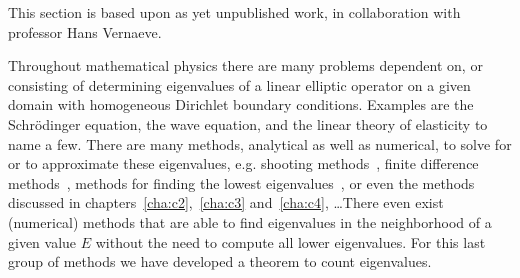 This section is based upon as yet unpublished work, in collaboration with professor Hans Vernaeve.

Throughout mathematical physics there are many problems dependent on, or consisting of determining eigenvalues of a linear elliptic operator on a given domain with homogeneous Dirichlet boundary conditions. Examples are the Schrödinger equation, the wave equation, and the linear theory of elasticity to name a few. There are many methods, analytical as well as numerical, to solve for or to approximate these eigenvalues, e.g. shooting methods~\cite{ixaru_numerical_1984,ixaru_new_2010}, finite difference methods~\cite{wang_new_2009}, methods for finding the lowest eigenvalues~\cite{braun_efficient_1996}, or even the methods discussed in chapters~\ref{cha:c2},~\ref{cha:c3} and~\ref{cha:c4}, \dots There even exist (numerical) methods that are able to find eigenvalues in the neighborhood of a given value $E$ without the need to compute all lower eigenvalues. For this last group of methods we have developed a theorem to count eigenvalues.

